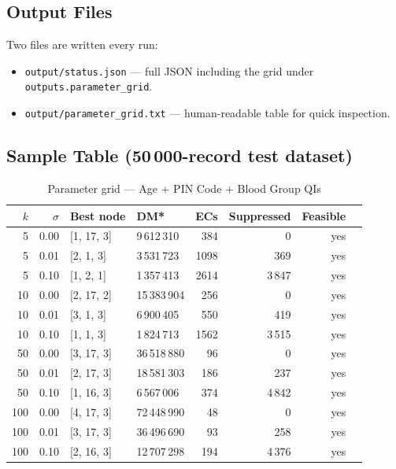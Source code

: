 \documentclass[12pt,a4paper]{article}
\begin{document}
\subsection{Output Files}

Two files are written every run:

\begin{itemize}
  \item \texttt{output/status.json} — full JSON including the grid under
        \texttt{outputs.parameter\_grid}.
  \item \texttt{output/parameter\_grid.txt} — human-readable table for quick
        inspection.
\end{itemize}

\subsection{Sample Table (50\,000-record test dataset)}

\begin{table}[H]
\centering
\caption{Parameter grid — Age + PIN Code + Blood Group QIs}
\begin{tabular}{rrllrrrl}
\toprule
$k$ & $\sigma$ & Best node & DM* & ECs & Suppressed & Feasible \\
\midrule
5   & 0.00 & [1, 17, 3] &  9\,612\,310 &  384 &     0 & yes \\
5   & 0.01 & [2,  1, 3] &  3\,531\,723 & 1098 &   369 & yes \\
5   & 0.10 & [1,  2, 1] &  1\,357\,413 & 2614 & 3\,847 & yes \\
10  & 0.00 & [2, 17, 2] & 15\,383\,904 &  256 &     0 & yes \\
10  & 0.01 & [3,  1, 3] &  6\,900\,405 &  550 &   419 & yes \\
10  & 0.10 & [1,  1, 3] &  1\,824\,713 & 1562 & 3\,515 & yes \\
50  & 0.00 & [3, 17, 3] & 36\,518\,880 &   96 &     0 & yes \\
50  & 0.01 & [2, 17, 3] & 18\,581\,303 &  186 &   237 & yes \\
50  & 0.10 & [1, 16, 3] &  6\,567\,006 &  374 & 4\,842 & yes \\
100 & 0.00 & [4, 17, 3] & 72\,448\,990 &   48 &     0 & yes \\
100 & 0.01 & [3, 17, 3] & 36\,496\,690 &   93 &   258 & yes \\
100 & 0.10 & [2, 16, 3] & 12\,707\,298 &  194 & 4\,376 & yes \\
\bottomrule
\end{tabular}
\end{table}
\end{document}

